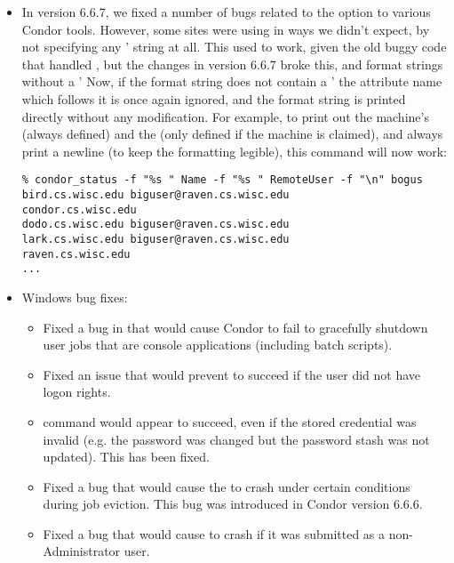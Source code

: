 \begin{itemize}

\item In version 6.6.7, we fixed a number of bugs related to the
   option to various Condor tools.
  However, some sites were using  in ways we didn't
  expect, by not specifying any '%
  string at all.
  This used to work, given the old buggy code that handled
  , but the changes in version 6.6.7 broke this, and
  format strings without a '%
  Now, if the format string does not contain a '%
  the attribute name which follows it is once again ignored, and the
  format string is printed directly without any modification.
  For example, to print out the machine's  (always defined)
  and the  (only defined if the machine is claimed),
  and always print a newline (to keep the formatting legible), this
  command will now work:
\begin{verbatim}
% condor_status -f "%s " Name -f "%s " RemoteUser -f "\n" bogus
bird.cs.wisc.edu biguser@raven.cs.wisc.edu
condor.cs.wisc.edu
dodo.cs.wisc.edu biguser@raven.cs.wisc.edu
lark.cs.wisc.edu biguser@raven.cs.wisc.edu
raven.cs.wisc.edu
...
\end{verbatim}

\item Windows bug fixes:
\begin{itemize}

\item Fixed a bug in that would cause Condor to fail to gracefully
shutdown user jobs that are console applications (including batch
scripts).

\item Fixed an issue that would prevent  to succeed
if the user did not have \verb@NETWORK@ logon rights.

\item {}  command would appear to succeed,
even if the stored credential was invalid (e.g. the password was changed
but the password stash was not updated). This has been fixed.


\item Fixed a bug that would cause the  to crash under
certain conditions during job eviction. This bug was introduced in Condor
version 6.6.6.

\item Fixed a bug that would cause  to crash if it was
submitted as a non-Administrator user.


\end{itemize}
\end{itemize}
